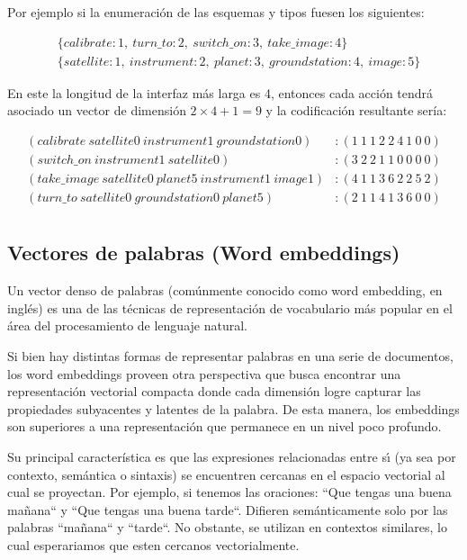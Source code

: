 Por ejemplo si la enumeración de las esquemas y tipos fuesen los siguientes:

\begin{align*}
    &\{calibrate: 1,\ turn\_to: 2,\ switch\_on:3,\ take\_image:4 \} \\
    &\{satellite: 1,\ instrument: 2,\ planet: 3,\ groundstation: 4,\ image: 5\}
\end{align*}

En este la longitud de la interfaz más larga es 4, entonces cada acción tendrá
asociado un vector de dimensión $2 \times 4 + 1 = 9$ y la codificación
resultante sería:

\begin{align*}
    (calibrate\ satellite0\ instrument1\ groundstation0) &: (1\ 1\ 1\ 2\ 2\ 4\ 1\ 0\ 0) \\
    (switch\_on\ instrument1\ satellite0) &: (3\ 2\ 2\ 1\ 1\ 0\ 0\ 0\ 0) \\
    (take\_image\ satellite0\ planet5\ instrument1\ image1) &: (4\ 1\ 1\ 3\ 6\ 2\ 2\ 5\ 2) \\
    (turn\_to\ satellite0\ groundstation0\ planet5) &: (2\ 1\ 1\ 4\ 1\ 3\ 6\ 0\ 0) \\
\end{align*}

\subsection{Vectores de palabras (Word embeddings)}

Un vector denso de palabras (comúnmente conocido como word embedding, en inglés)
es una de las técnicas de representación de vocabulario más popular en el área
del procesamiento de lenguaje natural.

Si bien hay distintas formas de representar palabras en una serie de documentos,
los word embeddings proveen otra perspectiva que busca encontrar una
representación vectorial compacta donde cada dimensión logre capturar las
propiedades subyacentes y latentes de la palabra. De esta manera, los embeddings
son superiores a una representación que permanece en un nivel poco profundo.

Su principal característica  es que las expresiones relacionadas entre sı́ (ya
sea por contexto, semántica o sintaxis) se encuentren cercanas en el espacio
vectorial al cual se proyectan. Por ejemplo, si tenemos las oraciones: ``Que
tengas una buena mañana`` y ``Que tengas una buena tarde``. Difieren
semánticamente solo por las palabras ``mañana`` y ``tarde``. No obstante, se
utilizan en contextos similares, lo cual esperariamos que esten cercanos
vectorialmente.

